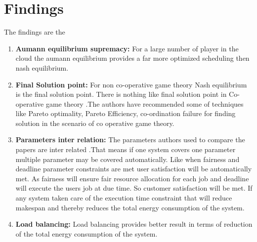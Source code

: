 \documentclass[10pt]{report}
\begin{document}
\chapter{Findings}
 The findings are the 
 \begin{enumerate}
 \item \textbf{	Aumann equilibrium supremacy:} For a large number of player in the cloud the aumann equilibrium provides a far more optimized scheduling then nash equilibrium.
\item \textbf{Final Solution point:} For non co-operative game theory Nash equilibrium is the final solution point. There is nothing like final solution point in Co-operative game theory .The authors have recommended some of techniques like Pareto optimality, Pareto Efficiency, co-ordination failure for  finding solution in the scenario of co operative game theory.
\item \textbf{Parameters inter relation:} The parameters authors used to compare the papers are inter related .That means if  one system covers one parameter multiple parameter may be covered automatically. Like when fairness and deadline parameter  constraints are met user satisfaction will be automatically met. As fairness will ensure fair resource allocation for each job and deadline will execute the users job  at due time. So customer satisfaction will be met. If any system taken care of the execution time constraint that will reduce makespan and thereby reduces  the total energy consumption of the system.
\item \textbf{Load balancing:} Load  balancing provides  better result in terms of reduction of the total energy consumption of the system.

 \end{enumerate}
 
\end{document}

